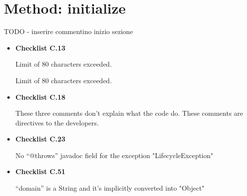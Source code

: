 \documentclass[../../../../codeInspection.tex]{subfiles}
\begin{document}
	\section{Method: initialize}

		TODO - inserire commentino inizio sezione

		\begin{itemize}

			\item \textbf{Checklist C.13}

				  

				  Limit of 80 characters exceeded.

				  

				  Limit of 80 characters exceeded.

			\item \textbf{Checklist C.18}

				  

				  

				  

				  These three comments don't explain what the code do. These comments are directives to the developers.

			\item \textbf{Checklist C.23}

				  

				  No “@throws” javadoc field for the exception "LifecycleException"

			\item \textbf{Checklist C.51}

				  

				  “domain” is a String and it's implicitly converted into "Object"

				  


\end{itemize}
\end{document}
